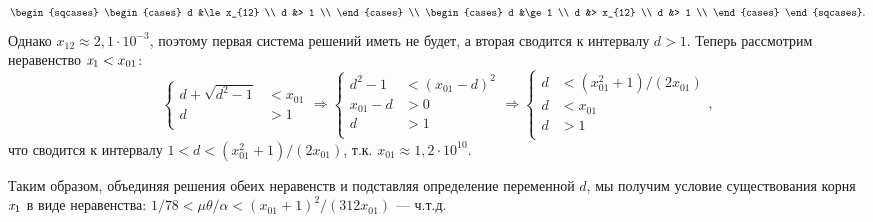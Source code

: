 \begin{Proof}
\begin{equation}
\begin{sqcases}
\begin{cases}
                d &\le x_{12} \\
                d &> 1 \\
            \end{cases} \\
            \begin{cases}
                d &\ge 1 \\
                d &> x_{12} \\
                d &> 1 \\
            \end{cases}
        \end{sqcases}.
    \end{equation}
    Однако $x_{12} \approx 2,1 \cdot 10^{-3}$, поэтому первая система решений иметь не будет, а вторая сводится к интервалу $d > 1$. Теперь рассмотрим неравенство $\mathit{x}_{1} < x_{01}$: \\
    \begin{equation}
        \nonumber
        \begin{cases}
            d + \sqrt{d^{2} - 1} &< x_{01} \\
            d &> 1 \\
            \end{cases}
        \Rightarrow
            \begin{cases}
            d^{2} - 1 &< \left( x_{01} - d \right)^{2} \\
            x_{01} - d &> 0 \\
            d &> 1 \\
            \end{cases}
        \Rightarrow
        \begin{cases}
            d &< (x_{01}^{2} + 1) / (2 x_{01}) \\
            d &< x_{01} \\
            d &> 1 \\
        \end{cases},
    \end{equation}
    что сводится к интервалу $1 < d < (x_{01}^{2} + 1) / (2 x_{01})$, т.к. $x_{01} \approx 1,2 \cdot 10^{10}$. 
    
    Таким образом, объединяя решения обеих неравенств и подставляя определение переменной $d$, мы получим условие существования корня $\mathit{x}_{1}$ в виде неравенства: 
    $ 1 / 78 < \mu \theta / \alpha < (x_{01} + 1)^{2} / (312 x_{01}) $ --- ч.т.д.
\end{Proof}

